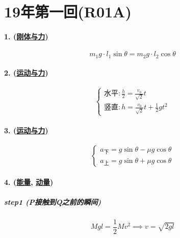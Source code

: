 
\section{19年第一回(R01A)}

\paragraph{1. (\hyperref[subsec:刚体与力]{刚体与力})}

\begin{equation*}
    m_1g\cdot l_1\sin\theta=m_2g\cdot l_2\cos\theta
\end{equation*}

\paragraph{2. (\hyperref[subsec:运动与力]{运动与力})}

\begin{equation*}
    \begin{cases}
        \textrm{水平}:\frac{h}{2}=\frac{v_0}{\sqrt{2}}t\\
        \textrm{竖直}:h=\frac{v_0}{\sqrt{2}}t+\frac12gt^2
    \end{cases}
\end{equation*}

\paragraph{3. (\hyperref[subsec:运动与力]{运动与力})}

\begin{equation*}
    \begin{cases}
        a_\textrm{下}=g\sin\theta-\mu g\cos\theta\\
        a_\textrm{上}=g\sin\theta+\mu g\cos\theta
    \end{cases}
\end{equation*}

\paragraph{4. (\hyperref[subsec:能量]{能量}, \hyperref[subsec:动量]{动量})}

\subparagraph{step1 (P接触到Q之前的瞬间)}

\begin{equation*}
    Mgl=\frac12Mv^2\implies
    v=\sqrt{2gl}
\end{equation*}

